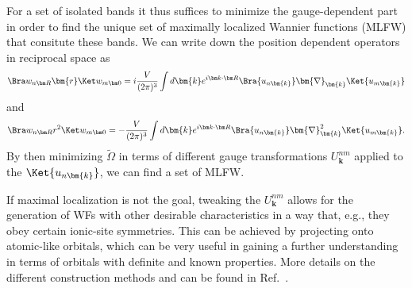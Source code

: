 For a set of isolated bands it thus suffices to minimize the gauge-dependent part in order to find the  unique set of maximally localized Wannier functions (MLFW) that consitute these bands\cite{Kunes2004, Marzari2012}.
We can write down the position dependent operators in reciprocal space as\cite{Blount1962}
\begin{equation}
\ShortWanBra{n}{R}\bm{r}\ShortWanKet{m}{0} = i \frac{V}{(2\pi)^3}\int d\bm{k} \eikr{R}\Bra{u_{n\bm{k}}} \bm{\nabla}_{\bm{k}} \Ket{u_{m\bm{k}}}
\end{equation}
and
\begin{equation}
\ShortWanBra{n}{R}r^2\ShortWanKet{m}{0} = -\frac{V}{(2\pi)^3}\int d\bm{k} \eikr{R}\Bra{u_{n\bm{k}}} \bm{\nabla}_{\bm{k}}^2 \Ket{u_{m\bm{k}}}.
\end{equation}
By then minimizing $\tilde\Omega$ in terms of different gauge transformations $U^{nm}_{\bm{k}}$ applied to the $\Ket{u_{n\bm{k}}}$, we can find a set of MLFW. 

If maximal localization is not the goal, tweaking the $U^{nm}_{\bm{k}}$ allows for the generation of WFs with other desirable characteristics in a way that, e.g., they obey certain ionic-site symmetries.
This can be achieved by projecting onto atomic-like orbitals, which can be very useful in gaining a further understanding in terms of orbitals with definite and known properties.
More details on the different construction methods and can be found in Ref.~\cite{Marzari2012}.

